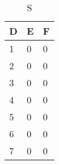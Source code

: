 \documentclass[12pt]{article}
\begin{document}
\begin{enumerate}
\begin{table}[]
	\caption{S}
	\centering
	\begin{tabular}{|l|l|l|}
	\hline
	\textbf{D} & \textbf{E} & \textbf{F} \\ \hline
	1          & 0          & 0          \\ \hline
	2          & 0          & 0          \\ \hline
	3          & 0          & 0          \\ \hline
	4          & 0          & 0          \\ \hline
	5          & 0          & 0          \\ \hline
	6          & 0          & 0          \\ \hline
	7          & 0          & 0          \\ \hline
	\end{tabular}
	\end{table}


\end{enumerate}
\end{document}
